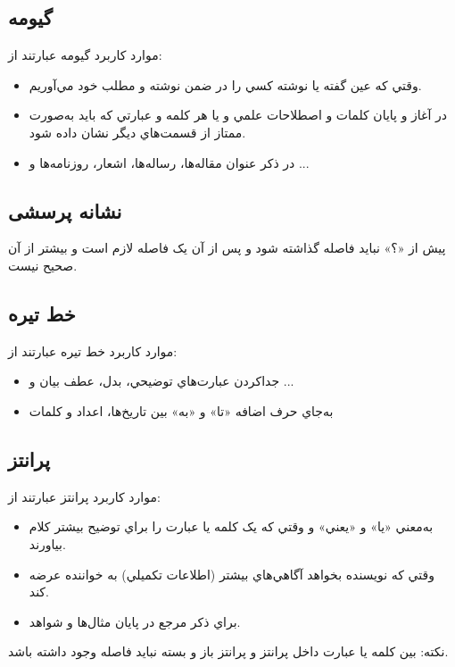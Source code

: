 \subsection{گیومه}
موارد کاربرد گیومه عبارتند از:
\begin{itemize}
\item
وقتي که عين گفته يا نوشته کسي را در ضمن نوشته و مطلب خود مي‌آوريم. 
\item
در آغاز و پايان کلمات و اصطلاحات علمي و يا هر کلمه و عبارتي که بايد به‌صورت ممتاز از قسمت‌هاي ديگر نشان داده شود.
\item
در ذکر عنوان مقاله‌ها، رساله‌ها، اشعار، روزنامه‌ها و ...
\end{itemize}
\subsection{نشانه پرسشی}
پیش از «؟» نبايد فاصله گذاشته شود و پس از آن يک فاصله لازم است و بيشتر از آن صحیح نیست.
\subsection{خط تیره}
موارد کاربرد خط تیره عبارتند از:
\begin{itemize}
\item
جدا‌کردن عبارت‌هاي توضيحي، بدل، عطف بيان و ...
\item
به‌جاي حرف اضافه «تا» و «به» بين تاريخ‌ها، اعداد و کلمات
\end{itemize}
\subsection{پرانتز}
موارد کاربرد پرانتز عبارتند از:
\begin{itemize}
\item
به‌معني «يا» و «يعني» و وقتي که یک کلمه يا عبارت را براي توضيح بيشتر کلام بياورند.
\item
وقتي که نويسنده بخواهد آگاهي‌هاي بيشتر (اطلاعات تکميلي) به خواننده عرضه کند.
\item
براي ذکر مرجع در پايان مثال‌ها و شواهد.
\end{itemize}
نکته: بین کلمه یا عبارت داخل پرانتز و پرانتز باز و بسته نباید فاصله وجود داشته باشد.
